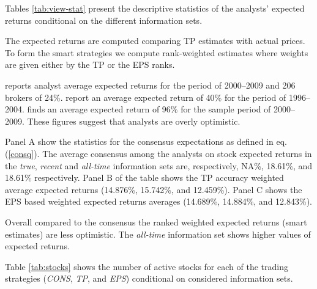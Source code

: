 \documentclass{article}\usepackage[]{graphicx}\usepackage[]{color}
\newcommand{\tr}{\textit{true}}
\newcommand{\naive}{\textit{recent}}
\newcommand{\default}{\textit{all-time}}
\begin{document}
Tables \ref{tab:view-stat} present the descriptive statistics of the analysts' expected returns conditional on the different information sets. 


The expected returns  are computed comparing TP estimates with actual prices. To form the smart strategies we compute rank-weighted estimates where weights are given either by the TP or the EPS ranks. 

\cite{bradshaw2002} reports analyst average expected returns for the period of 2000--2009 and 206 brokers of 24\%. \cite{da2011} report an average expected return of 40\% for the period of 1996--2004. \cite{zhou2013} finds an average expected return of 96\% for the sample period of 2000--2009. These figures suggest that analysts are overly optimistic.

Panel A show the statistics for the consensus expectations as defined in eq. (\ref{consq}). The average consensus among the analysts on stock expected returns in the  \tr{}, \naive{} and \default{} information sets are, respectively, NA\%, 18.61\%, and 18.61\% respectively. Panel B of the table shows the TP accuracy weighted average expected returns (14.876\%, 15.742\%, and 12.459\%). Panel C shows the EPS based weighted expected returns averages (14.689\%, 14.884\%, and 12.843\%). 

Overall compared to the consensus the ranked weighted expected returns (smart estimates) are less optimistic. The \default{} information set shows higher values of expected returns.

Table \ref{tab:stocks} shows the number of active stocks for each of the trading strategies (\textit{CONS}, \textit{TP}, and \textit{EPS}) conditional on considered information sets.
\end{document}
